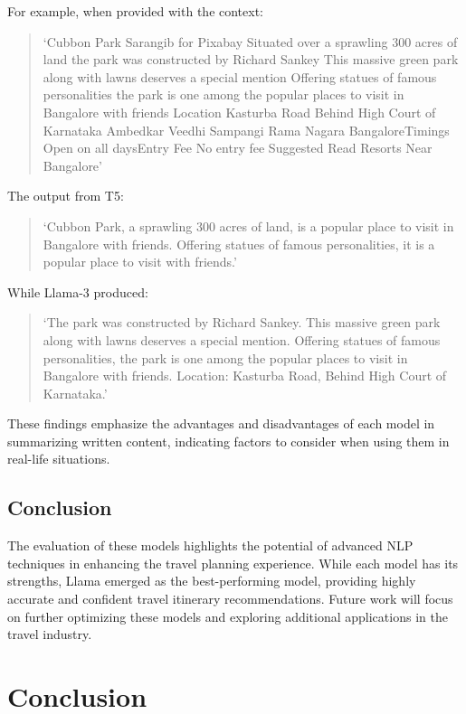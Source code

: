 \documentclass[conference]{IEEEtran}
\begin{document}
        For example, when provided with the context:
        \begin{quote}
        ‘Cubbon Park Sarangib for Pixabay Situated over a sprawling 300 acres of land the park was constructed by Richard Sankey This massive green park along with lawns deserves a special mention Offering statues of famous personalities the park is one among the popular places to visit in Bangalore with friends Location Kasturba Road Behind High Court of Karnataka Ambedkar Veedhi Sampangi Rama Nagara BangaloreTimings Open on all daysEntry Fee No entry fee Suggested Read Resorts Near Bangalore’
        \end{quote}

        The output from T5:
        \begin{quote}
        ‘Cubbon Park, a sprawling 300 acres of land, is a popular place to visit in Bangalore with friends. Offering statues of famous personalities, it is a popular place to visit with friends.’
        \end{quote}

        While Llama-3 produced:
        \begin{quote}
        ‘The park was constructed by Richard Sankey. This massive green park along with lawns deserves a special mention. Offering statues of famous personalities, the park is one among the popular places to visit in Bangalore with friends. Location: Kasturba Road, Behind High Court of Karnataka.’
        \end{quote}

    These findings emphasize the advantages and disadvantages of each model in summarizing written content, indicating factors to consider when using them in real-life situations.

    \subsection{Conclusion}

        The evaluation of these models highlights the potential of advanced NLP techniques in enhancing the travel planning experience. While each model has its strengths, Llama emerged as the best-performing model, providing highly accurate and confident travel itinerary recommendations. Future work will focus on further optimizing these models and exploring additional applications in the travel industry.

\section{Conclusion}
\end{document}

